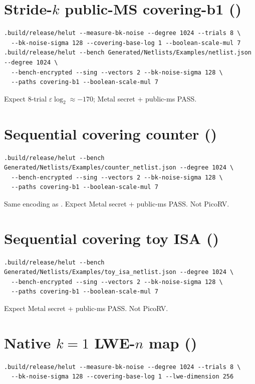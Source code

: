 \section{Stride-$k$ public-MS covering-b1 ()}

\begin{lstlisting}
.build/release/helut --measure-bk-noise --degree 1024 --trials 8 \
  --bk-noise-sigma 128 --covering-base-log 1 --boolean-scale-mul 7
.build/release/helut --bench Generated/Netlists/Examples/netlist.json --degree 1024 \
  --bench-encrypted --sing --vectors 2 --bk-noise-sigma 128 \
  --paths covering-b1 --boolean-scale-mul 7
\end{lstlisting}

Expect 8-trial $\varepsilon\log_2\approx-170$; Metal secret + public-ms PASS.

\section{Sequential covering counter ()}

\begin{lstlisting}
.build/release/helut --bench Generated/Netlists/Examples/counter_netlist.json --degree 1024 \
  --bench-encrypted --sing --vectors 2 --bk-noise-sigma 128 \
  --paths covering-b1 --boolean-scale-mul 7
\end{lstlisting}

Same encoding as \cid{52}. Expect Metal secret + public-ms PASS. Not PicoRV.

\section{Sequential covering toy ISA ()}

\begin{lstlisting}
.build/release/helut --bench Generated/Netlists/Examples/toy_isa_netlist.json --degree 1024 \
  --bench-encrypted --sing --vectors 2 --bk-noise-sigma 128 \
  --paths covering-b1 --boolean-scale-mul 7
\end{lstlisting}

Expect Metal secret + public-ms PASS. Not PicoRV.

\section{Native $k{=}1$ LWE-$n$ map (\cid{55})}

\begin{lstlisting}
.build/release/helut --measure-bk-noise --degree 1024 --trials 8 \
  --bk-noise-sigma 128 --covering-base-log 1 --lwe-dimension 256
\end{lstlisting}

